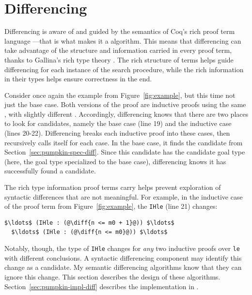 \section{Differencing}
\label{sec:pumpkin-diff}



Differencing is aware of and guided by the semantics of Coq's rich proof term language ---that is what makes it a  algorithm.
This means that differencing can take advantage of the structure and information carried in every proof term,
thanks to Gallina's rich type theory .
The rich structure of terms helps guide differencing for each instance of the search procedure,
while the rich information in their types helps ensure correctness in the end.

Consider once again the example from Figure~\ref{fig:example}, but this time not just the base case.
Both versions of the proof are inductive proofs using the same , with slightly different .
Accordingly, differencing knows that there are two places to look for candidates, namely the base case (line 19)
and the inductive case (lines 20-22).
Differencing breaks each inductive proof into these cases, then recursively calls itself for each case.
In the base case, it finds the candidate from Section~\ref{sec:pumpkin-spec-diff}.
Since this candidate has the candidate goal type (here, the goal type specialized to the base case), differencing knows it has successfully found a candidate.

The rich type information proof terms carry helps prevent exploration of syntactic differences that are not meaningful.
For example, in the inductive case of the proof term from Figure~\ref{fig:example}, the  \lstinline{IHle} (line 21) changes:

\begin{lstlisting}[language=coq]
  $\ldots$ (IHle : (@\diff{n <= m0 + 1}@)) $\ldots$
  $\ldots$ (IHle : (@\diff{n <= m0}@)) $\ldots$
\end{lstlisting}
Notably, though, the type of \lstinline{IHle} changes for \emph{any} two inductive proofs over \lstinline{le}
with different conclusions. A syntactic differencing component 
may identify this change as a candidate.
My semantic differencing algorithms know that they can ignore this change.
This section describes the design of these algorithms.
Section~\ref{sec:pumpkin-impl-diff} describes the implementation in \sysname.

